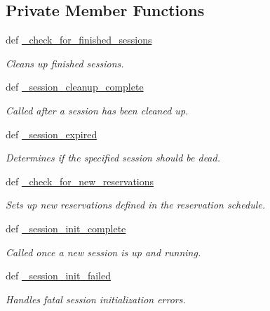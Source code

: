 \subsection*{Private Member Functions}
\begin{DoxyCompactItemize}
\item 
def \hyperlink{classhwm_1_1sessions_1_1coordinator_1_1_session_coordinator_a5158e029c113f93114f1b53927bcae4b}{\-\_\-check\-\_\-for\-\_\-finished\-\_\-sessions}
\begin{DoxyCompactList}\small\item\em Cleans up finished sessions. \end{DoxyCompactList}\item 
def \hyperlink{classhwm_1_1sessions_1_1coordinator_1_1_session_coordinator_afbc58e04263179f27c57a69785ab7705}{\-\_\-session\-\_\-cleanup\-\_\-complete}
\begin{DoxyCompactList}\small\item\em Called after a session has been cleaned up. \end{DoxyCompactList}\item 
def \hyperlink{classhwm_1_1sessions_1_1coordinator_1_1_session_coordinator_a6596817d843ddb4d3315ed9495f3e8fa}{\-\_\-session\-\_\-expired}
\begin{DoxyCompactList}\small\item\em Determines if the specified session should be dead. \end{DoxyCompactList}\item 
def \hyperlink{classhwm_1_1sessions_1_1coordinator_1_1_session_coordinator_aef6d481d9ca119603248bd9cca6947a5}{\-\_\-check\-\_\-for\-\_\-new\-\_\-reservations}
\begin{DoxyCompactList}\small\item\em Sets up new reservations defined in the reservation schedule. \end{DoxyCompactList}\item 
def \hyperlink{classhwm_1_1sessions_1_1coordinator_1_1_session_coordinator_a1c0cb93504f6ca81afb328c32ce3bcb3}{\-\_\-session\-\_\-init\-\_\-complete}
\begin{DoxyCompactList}\small\item\em Called once a new session is up and running. \end{DoxyCompactList}\item 
def \hyperlink{classhwm_1_1sessions_1_1coordinator_1_1_session_coordinator_a57cd8dc91d204f8122cbb8075c02c1cc}{\-\_\-session\-\_\-init\-\_\-failed}
\begin{DoxyCompactList}\small\item\em Handles fatal session initialization errors. \end{DoxyCompactList}\item 

\end{DoxyCompactItemize}
